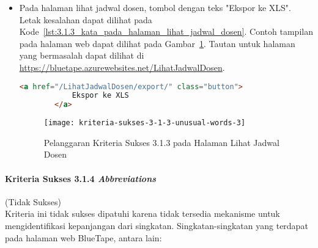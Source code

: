 \begin{itemize}
    \item Pada halaman lihat jadwal dosen, tombol dengan teks "Ekspor ke XLS". Letak kesalahan dapat dilihat pada \mbox{Kode \ref{lst:3.1.3_kata_pada_halaman_lihat_jadwal_dosen}}. Contoh tampilan pada halaman web dapat dilihat pada \mbox{Gambar \ref{fig:3.1.3_unusual_words_3}}. Tautan untuk halaman yang bermasalah dapat dilihat di \url{https://bluetape.azurewebsites.net/LihatJadwalDosen}.
    \begin{lstlisting}[frame=single, label={lst:3.1.3_kata_pada_halaman_lihat_jadwal_dosen}, language=HTML, caption=Pelanggaran Kriteria Sukses 3.1.3 pada Halaman Lihat Jadwal Dosen]
        <a href="/LihatJadwalDosen/export/" class="button">
            Ekspor ke XLS
        </a>
    \end{lstlisting}
    
    \begin{figure}[H]
        \centering  
        \texttt{[image: kriteria-sukses-3-1-3-unusual-words-3]}  
        \caption[Pelanggaran Kriteria Sukses 3.1.3 pada Halaman Lihat Jadwal Dosen]{Pelanggaran Kriteria Sukses 3.1.3 pada Halaman Lihat Jadwal Dosen}
        \label{fig:3.1.3_unusual_words_3}  
    \end{figure}
    
\end{itemize}

\paragraph{Kriteria Sukses 3.1.4 \textit{Abbreviations}}
\label{par:kepatuhan_bluetape_kriteria_sukses_3.1.4}
(Tidak Sukses)\\

Kriteria ini tidak sukses dipatuhi karena tidak tersedia mekanisme untuk mengidentifikasi kepanjangan dari singkatan. Singkatan-singkatan yang terdapat pada halaman web BlueTape, antara lain:

